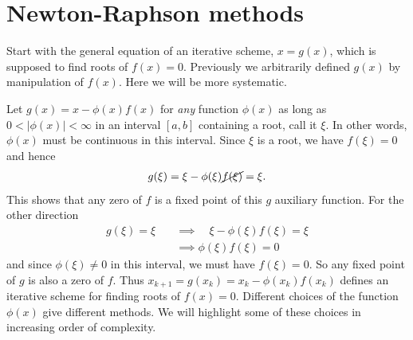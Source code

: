 \section{Newton-Raphson methods}

Start with the general equation of an iterative scheme, $x = g(x)$, which is supposed to find roots of $f(x) = 0$. Previously we arbitrarily defined $g(x)$ by manipulation of $f(x)$. Here we will be more systematic.

Let $g(x) = x - \phi(x) f(x)$ for \textit{any} function $\phi(x)$ as long as $0 < |\phi(x)| < \infty$ in an interval $[a,b]$ containing a root, call it $\xi$. In other words, $\phi(x)$ must be continuous in this interval. Since $\xi$ is a root, we have $f(\xi)=0$ and hence
\begin{align*}
g(\xi) = \xi - \phi(\xi)\cancel{f(\xi)} = \xi.
\end{align*}
This shows that any zero of $f$ is a fixed point of this $g$ auxiliary function. For the other direction
\begin{align*}
g(\xi) = \xi \quad &\implies\quad \xi - \phi(\xi)f(\xi) = \xi\\
&\implies \phi(\xi)f(\xi) = 0
\end{align*}
and since $\phi(\xi)\neq 0$ in this interval, we must have $f(\xi)=0$. So any fixed point of $g$ is also a zero of $f$. Thus $x_{k+1} = g(x_k) = x_k - \phi(x_k) f(x_k)$ defines an iterative scheme for finding roots of $f(x)=0$. Different choices of the function $\phi(x)$ give different methods. We will highlight some of these choices in increasing order of complexity.

